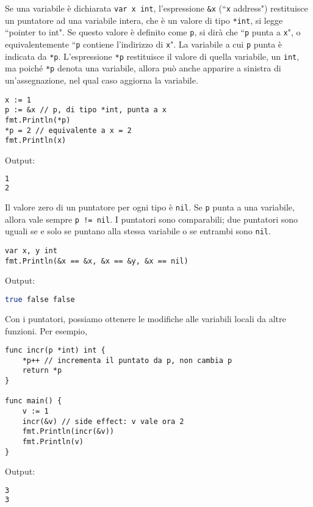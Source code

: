 \documentclass[../../../thesis.tex]{subfiles}
\begin{document}
    Se una variabile è dichiarata \verb"var x int", l'espressione \verb"&x" (``\verb"x" address") restituisce un puntatore ad una variabile intera, che è un valore di tipo \verb"*int", si legge ``pointer to int".
    Se questo valore è definito come \verb"p", si dirà che ``\verb"p" punta a \verb"x"", o equivalentemente ``\verb"p" contiene l'indirizzo di \verb"x"". La variabile a cui \verb"p" punta è indicata da \verb"*p".
    L'espressione \verb"*p" restituisce il valore di quella variabile, un \verb"int", ma poiché \verb"*p" denota una variabile, allora può anche apparire a sinistra di un'assegnazione, nel qual caso aggiorna la variabile.
    \begin{lstlisting}[frame = single,label={lst:lstlisting1-3-2.1}]
x := 1
p := &x // p, di tipo *int, punta a x
fmt.Println(*p)
*p = 2 // equivalente a x = 2
fmt.Println(x)
    \end{lstlisting}
    Output:
    \begin{lstlisting}[language = bash, frame = L,label={lst:lstlisting1-3-2.2}]
1
2
    \end{lstlisting}
    Il valore zero di un puntatore per ogni tipo è \verb"nil".
    Se \verb"p" punta a una variabile, allora vale sempre \verb"p != nil".
    I puntatori sono comparabili;
    due puntatori sono uguali se e solo se puntano alla stessa variabile o se entrambi sono \verb"nil".
    \begin{lstlisting}[frame = single,label={lst:lstlisting1-3-2.3}]
var x, y int
fmt.Println(&x == &x, &x == &y, &x == nil)
    \end{lstlisting}
    Output:
    \begin{lstlisting}[language = bash, frame = L,label={lst:lstlisting1-3-2.4}]
true false false
    \end{lstlisting}
    Con i puntatori, possiamo ottenere le modifiche alle variabili locali da altre funzioni.
    Per esempio,
    \begin{lstlisting}[frame = single,label={lst:lstlisting1-3-2.5}]
func incr(p *int) int {
    *p++ // incrementa il puntato da p, non cambia p
    return *p
}

func main() {
    v := 1
    incr(&v) // side effect: v vale ora 2
    fmt.Println(incr(&v))
    fmt.Println(v)
}
    \end{lstlisting}
    Output:
    \begin{lstlisting}[language = bash, frame = L,label={lst:lstlisting1-3-2.6}]
3
3
    \end{lstlisting}
\end{document}
